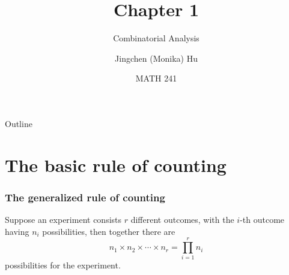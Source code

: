 \documentclass[slidestop,compress,mathserif]{beamer}
\title[Chapter 1]{Chapter 1}
\subtitle{Combinatorial Analysis}
\author[Jingchen (Monika) Hu]
{Jingchen (Monika) Hu}
\institute[Vassar]
{Vassar College}
\date[MATH 241]
{MATH 241}
\begin{document}


\begin{frame}%
\titlepage
\end{frame}

%
%
%
%


\begin{frame}{Outline}
\tableofcontents[hideallsubsections]
\end{frame}




\section{The basic rule of counting}

\begin{frame}\frametitle{The generalized rule of counting}

\begin{dinglist}{\DingListSymbolA}
\item Suppose an experiment consists $r$ different outcomes, with the $i$-th outcome having $n_i$ possibilities,
then together there are
\[
n_1 \times n_2 \times \cdots \times n_r = \prod_{i=1}^r n_i
\]
possibilities for the experiment.
\end{dinglist}



\end{frame}
\end{document}
